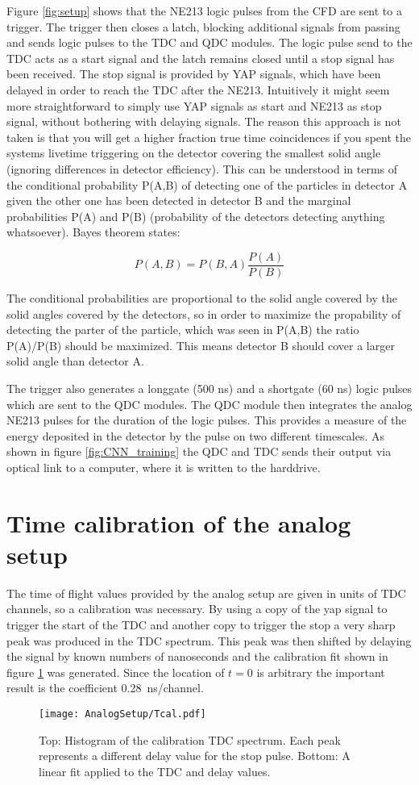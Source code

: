 \documentclass[main.tex]{subfiles}
\begin{document}
Figure \ref{fig:setup} shows that the NE213 logic pulses from the CFD are sent to a trigger. The trigger then closes a latch, blocking additional signals from passing and sends logic pulses to the TDC and QDC modules. The logic pulse send to the TDC acts as a start signal and the latch remains closed until a stop signal has been received. The stop signal is provided by YAP signals, which have been delayed in order to reach the TDC after the NE213. Intuitively it might seem more straightforward to simply use YAP signals as start and NE213 as stop signal, without bothering with delaying signals. The reason this approach is not taken is that you will get a higher fraction true time coincidences if you spent the systems livetime triggering on the detector covering the smallest solid angle (ignoring differences in detector efficiency). This can be understood in terms of the conditional probability P(A,B) of detecting one of the particles in detector A given the other one has been detected in detector B and the marginal probabilities  P(A) and P(B) (probability of the detectors detecting anything whatsoever). Bayes theorem states:

$$P(A,B) = P(B,A) \frac{P(A)}{P(B)}$$ 

The conditional probabilities are proportional to the solid angle covered by the solid angles covered by the detectors, so in order to maximize the propability of detecting the parter of the particle, which was seen in P(A,B) the ratio P(A)/P(B) should be maximized. This means detector B should cover a larger solid angle than detector A.

The trigger also generates a longgate (500 ns) and a shortgate (60 ns) logic pulses which are sent to the QDC modules. The QDC module then integrates the analog NE213 pulses for the duration of the logic pulses. This provides a measure of the energy deposited in the detector by the pulse on two different timescales. As shown in figure \ref{fig:CNN_training} the QDC and TDC sends their output via optical link to a computer, where it is written to the harddrive.

\section{Time calibration of the analog setup}\label{sec:timecal}
The time of flight values provided by the analog setup are given in units of TDC channels, so a calibration was necessary. By using a copy of the yap signal to trigger the start of the TDC and another copy to trigger the stop a very sharp peak was produced in the TDC spectrum.
This peak was then shifted by delaying the signal by known numbers of nanoseconds and the calibration fit shown in figure \ref{fig:Tcal} was generated. Since the location of $t=0$ is arbitrary the important result is the coefficient \SI{0.28}{\nano\second/channel}.
\begin{figure}[ht]
	\centering
    	\texttt{[image: AnalogSetup/Tcal.pdf]}
        \caption[TDC calibration of analog setup]{Top: Histogram of the calibration TDC spectrum. Each peak represents a different delay value for the stop pulse. Bottom: A linear fit applied to the TDC and delay values.}
	    \label{fig:Tcal} 
\end{figure}
\end{document}
